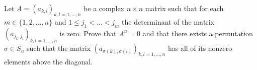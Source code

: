 Let $A=(a_{k,l})_{k,l=1,...,n}$ be a complex $n \times n$ matrix such that for each $m \in \{1,2,...,n\}$ and $1 \leq  j_{1} <...<j_{m}$ the determinant of the matrix $(a_{j_{k},j_{l}})_{k,l=1,...,n}$ is zero. Prove that $A^{n}=0$ and that there exists a permutation $\sigma \in S_{n}$ such that the matrix $(a_{\sigma(k),\sigma(l)})_{k,l=1,...,n}$ has all of its nonzero elements above the diagonal.